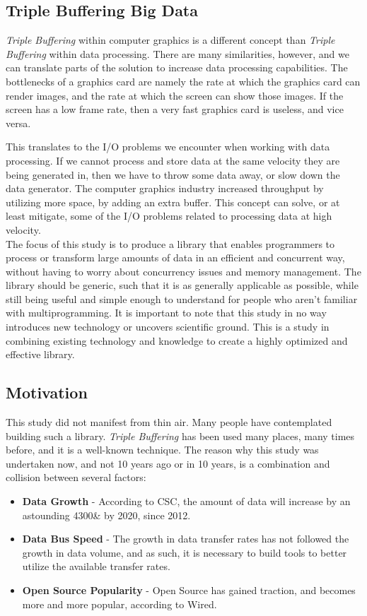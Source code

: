 \documentclass[a4paper]{article}
\begin{document}
\subsection{Triple Buffering Big Data}
\textit{Triple Buffering} within computer graphics is a different concept than \textit{Triple Buffering} within data processing. There are many similarities, however, and we can translate parts of the solution to increase data processing capabilities. The bottlenecks of a graphics card are namely the rate at which the graphics card can render images, and the rate at which the screen can show those images. If the screen has a low frame rate, then a very fast graphics card is useless, and vice versa. 

This translates to the I/O problems we encounter when working with data processing. If we cannot process and store data at the same velocity they are being generated in, then we have to throw some data away, or slow down the data generator. The computer graphics industry increased throughput by utilizing more space, by adding an extra buffer. This concept can solve, or at least mitigate, some of the I/O problems related to processing data at high velocity.\\

The focus of this study is to produce a library that enables programmers to process or transform large amounts of data in an efficient and concurrent way, without having to worry about concurrency issues and memory management. The library should be generic, such that it is as generally applicable as possible, while still being useful and simple enough to understand for people who aren't familiar with multiprogramming. It is important to note that this study in no way introduces new technology or uncovers scientific ground. This is a study in combining existing technology and knowledge to create a highly optimized and effective library.


\subsection{Motivation}
This study did not manifest from thin air. Many people have contemplated building such a library. \textit{Triple Buffering} has been used many places, many times before, and it is a well-known technique. The reason why this study was undertaken now, and not 10 years ago or in 10 years, is a combination and collision between several factors:

\begin{itemize}
\item \textbf{Data Growth} - According to CSC, the amount of data will increase by an astounding 4300\& by 2020, since 2012\cite{datagrowth}. 
\item \textbf{Data Bus Speed} - The growth in data transfer rates has not followed the growth in data volume, and as such, it is necessary to build tools to better utilize the available transfer rates.
\item \textbf{Open Source Popularity} - Open Source has gained traction, and becomes more and more popular, according to Wired\cite{opensourcegrowth}.
\end{itemize} 
\end{document}
